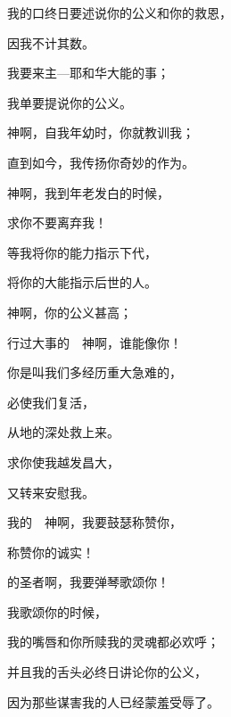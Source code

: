 {\par }{\Q {}我的口终日要述说你的公义和你的救恩，
\par }{\Q 因我不计其数。
\par }{\Q {}我要来{}主—耶和华大能的事；
\par }{\Q 我单要提说你的公义。
\par }{\BB \par }{\Q {}神啊，自我年幼时，你就教训我；
\par }{\Q 直到如今，我传扬你奇妙的作为。
\par }{\Q {}神啊，我到年老发白的时候，
\par }{\Q 求你不要离弃我！
\par }{\Q 等我将你的能力指示下代，
\par }{\Q 将你的大能指示后世的人。
\par }{\BB \par }{\Q {}神啊，你的公义甚高；
\par }{\Q 行过大事的　神啊，谁能像你！
\par }{\Q {}你是叫我们多经历重大急难的，
\par }{\Q 必使我们复活，
\par }{\Q 从地的深处救上来。
\par }{\Q {}求你使我越发昌大，
\par }{\Q 又转来安慰我。
\par }{\BB \par }{\Q {}我的　神啊，我要鼓瑟称赞你，
\par }{\Q 称赞你的诚实！
\par }{的圣者啊，我要弹琴歌颂你！
\par }{\Q {}我歌颂你的时候，
\par }{\Q 我的嘴唇和你所赎我的灵魂都必欢呼；
\par }{\Q {}并且我的舌头必终日讲论你的公义，
\par }{\Q 因为那些谋害我的人已经蒙羞受辱了。

}
